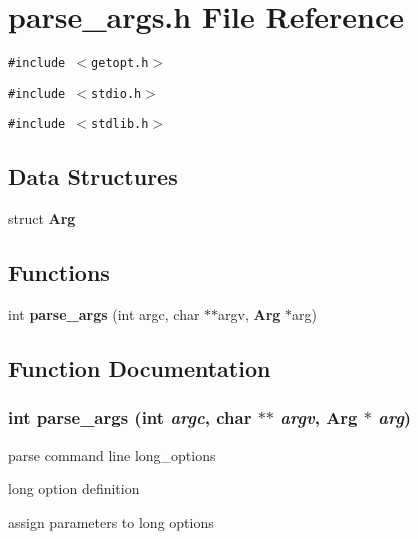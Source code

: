 \section{parse\_\-args.h File Reference}
\label{parse__args_8h}
{\tt \#include $<$getopt.h$>$}\par
{\tt \#include $<$stdio.h$>$}\par
{\tt \#include $<$stdlib.h$>$}\par
\subsection*{Data Structures}
\begin{CompactItemize}
\item 
struct {\bf Arg}
\end{CompactItemize}
\subsection*{Functions}
\begin{CompactItemize}
\item 
int {\bf parse\_\-args} (int argc, char $\ast$$\ast$argv, {\bf Arg} $\ast$arg)
\end{CompactItemize}


\subsection{Function Documentation}
\subsubsection{\setlength{\rightskip}{0pt plus 5cm}int parse\_\-args (int {\em argc}, char $\ast$$\ast$ {\em argv}, {\bf Arg} $\ast$ {\em arg})}\label{parse__args_8h_dfb81e9b882e6aa0b57d2ca15a1564ba}


parse command line long\_\-options 

long option definition

assign parameters to long options 